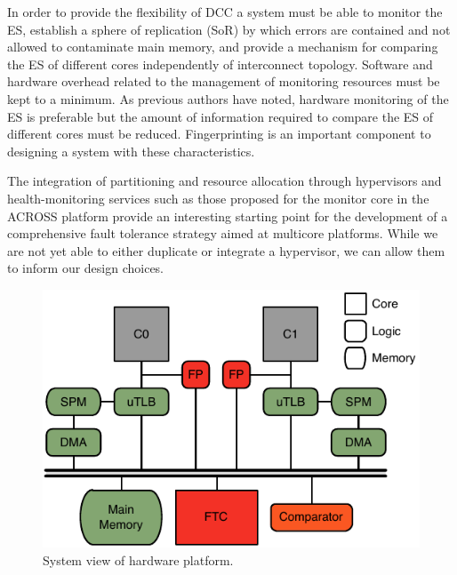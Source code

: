 In order to provide the flexibility of DCC a system must be able to monitor the ES, establish a sphere of replication (SoR) by which errors are contained and not allowed to contaminate main memory, and provide a mechanism for comparing the ES of different cores independently of interconnect topology. Software and hardware overhead related to the management of monitoring resources must be kept to a minimum. As previous authors have noted, hardware monitoring of the ES is preferable but the amount of information required to compare the ES of different cores must be reduced. Fingerprinting is an important component to designing a system with these characteristics. 

The integration of partitioning and resource allocation through hypervisors and health-monitoring services such as those proposed for the monitor core in the ACROSS platform provide an interesting starting point for the development of a comprehensive fault tolerance strategy aimed at multicore platforms. While we are not yet able to either duplicate or integrate a hypervisor, we can allow them to inform our design choices.

\begin{figure}[h]
\centering
\includegraphics[scale=1.5]{Figures/architecture}
\caption{System view of hardware platform.}
\label{f:arch}
\end{figure}

